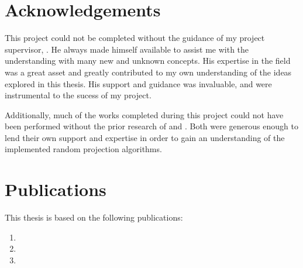 \documentclass[a4paper]{report}
\begin{document}

\chapter*{Acknowledgements}
This project could not be completed without the guidance of my project 
supervisor, \supervisorName{}. He always made himself available to assist me 
with the understanding with many new and unknown concepts. His expertise in the 
field was a great asset and greatly contributed to my own understanding of the 
ideas explored in this thesis. His support and guidance was invaluable, and were
instrumental to the sucess of my project. 

Additionally, much of the works completed during this project could not have 
been performed without the prior research of \contributorOne{} and 
\contributorTwo{}. Both were generous enough to lend their own support and 
expertise in order to gain an understanding of the implemented random projection
algorithms.

\chapter*{Publications}
This thesis is based on the following publications:
\begin{enumerate}
\item {}
\item {}
\item {}
\end{enumerate}
\end{document}
